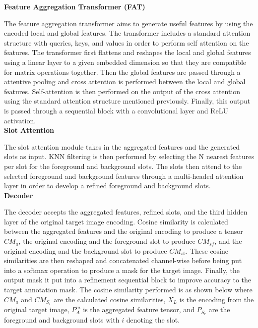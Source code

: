 \documentclass{article}
\theoremstyle{plain}
\theoremstyle{definition}
\theoremstyle{remark}
\begin{document}
\textbf{Feature Aggregation Transformer (FAT)}

The feature aggregation transformer aims to generate useful features by using the encoded local and global features. The transformer includes a standard attention structure with queries, keys, and values in order to perform self attention on the features. The transformer first flattens and reshapes the local and global features using a linear layer to a given embedded dimension so that they are compatible for matrix operations together. Then the global features are passed through a attentive pooling and cross attention is performed between the local and global features. Self-attention is then performed on the output of the cross attention using the standard attention structure mentioned previously. Finally, this output is passed through a sequential block with a convolutional layer and ReLU activation.\\

\textbf{Slot Attention}

The slot attention module takes in the aggregated features and the generated slots as input. KNN filtering is then performed by selecting the N nearest features per slot for the foreground and background slots. The slots then attend to the selected foreground and background features through a multi-headed attention layer in order to develop a refined foreground and background slots.\\

\textbf{Decoder}

\hspace{20pt} The decoder accepts the aggregated features, refined slots, and the third hidden layer of the original target image encoding. Cosine similarity is calculated between the aggregated features and the original encoding to produce a tensor $CM_a$, the original encoding and the foreground slot to produce $CM_{sf}$, and the original encoding and the background slot to produce $CM_{sb}$. These cosine similarities are then reshaped and concatenated channel-wise before being put into a softmax operation to produce a mask for the target image. Finally, the output mask it put into a refinement sequential block to improve accuracy to the target annotation mask.
\hspace{20pt} The cosine similarity performed is as shown below where $CM_a$ and $CM_{S_r}$ are the calculated cosine similarities, $X_L$ is the encoding from the original target image, $P_A^m$ is the aggregated feature tensor, and $P_{S_r}$ are the foreground and background slots with $i$ denoting the slot.
\end{document}
